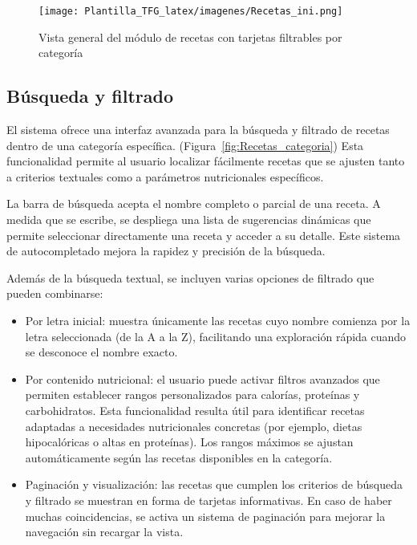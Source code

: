 \begin{figure}[t]
    \centering
    \texttt{[image: Plantilla\_TFG\_latex/imagenes/Recetas\_ini.png]}
    \caption{Vista general del módulo de recetas con tarjetas filtrables por categoría}
    \label{fig:consultas_recetas}
\end{figure}

\subsection{Búsqueda y filtrado}
El sistema ofrece una interfaz avanzada para la búsqueda y filtrado de recetas dentro de una categoría específica. (Figura~\ref{fig:Recetas_categoria})  Esta funcionalidad permite al usuario localizar fácilmente recetas que se ajusten tanto a criterios textuales como a parámetros nutricionales específicos.

La barra de búsqueda acepta el nombre completo o parcial de una receta. A medida que se escribe, se despliega una lista de sugerencias dinámicas que permite seleccionar directamente una receta y acceder a su detalle. Este sistema de autocompletado mejora la rapidez y precisión de la búsqueda.

Además de la búsqueda textual, se incluyen varias opciones de filtrado que pueden combinarse:

\begin{itemize}
    \item Por letra inicial: muestra únicamente las recetas cuyo nombre comienza por la letra seleccionada (de la A a la Z), facilitando una exploración rápida cuando se desconoce el nombre exacto.

    \item Por contenido nutricional: el usuario puede activar filtros avanzados que permiten establecer rangos personalizados para calorías, proteínas y carbohidratos. Esta funcionalidad resulta útil para identificar recetas adaptadas a necesidades nutricionales concretas (por ejemplo, dietas hipocalóricas o altas en proteínas). Los rangos máximos se ajustan automáticamente según las recetas disponibles en la categoría.

    \item Paginación y visualización: las recetas que cumplen los criterios de búsqueda y filtrado se muestran en forma de tarjetas informativas. En caso de haber muchas coincidencias, se activa un sistema de paginación para mejorar la navegación sin recargar la vista.
\end{itemize}

